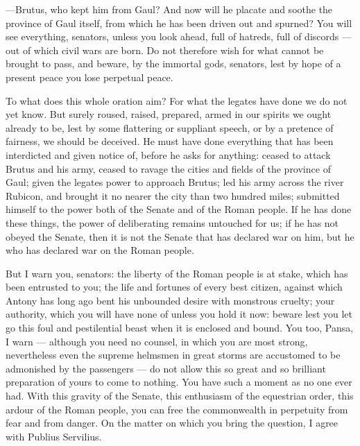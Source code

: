  ---Brutus, who kept him from Gaul? And now will he placate and soothe the province of Gaul itself, from which he has been driven out and spurned? You will see everything, senators, unless you look ahead, full of hatreds, full of discords --- out of which civil wars are born. Do not therefore wish for what cannot be brought to pass, and beware, by the immortal gods, senators, lest by hope of a present peace you lose perpetual peace.

 To what does this whole oration aim? For what the legates have done we do not yet know. But surely roused, raised, prepared, armed in our spirits we ought already to be, lest by some flattering or suppliant speech, or by a pretence of fairness, we should be deceived. He must have done everything that has been interdicted and given notice of, before he asks for anything: ceased to attack Brutus and his army, ceased to ravage the cities and fields of the province of Gaul; given the legates power to approach Brutus; led his army across the river Rubicon, and brought it no nearer the city than two hundred miles; submitted himself to the power both of the Senate and of the Roman people. If he has done these things, the power of deliberating remains untouched for us; if he has not obeyed the Senate, then it is not the Senate that has declared war on him, but he who has declared war on the Roman people.

 But I warn you, senators: the liberty of the Roman people is at stake, which has been entrusted to you; the life and fortunes of every best citizen, against which Antony has long ago bent his unbounded desire with monstrous cruelty; your authority, which you will have none of unless you hold it now: beware lest you let go this foul and pestilential beast when it is enclosed and bound. You too, Pansa, I warn --- although you need no counsel, in which you are most strong, nevertheless even the supreme helmsmen in great storms are accustomed to be admonished by the passengers --- do not allow this so great and so brilliant preparation of yours to come to nothing. You have such a moment as no one ever had. With this gravity of the Senate, this enthusiasm of the equestrian order, this ardour of the Roman people, you can free the commonwealth in perpetuity from fear and from danger. On the matter on which you bring the question, I agree with Publius Servilius.
